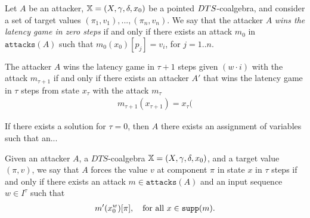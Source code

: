\begin{definition}
Let $A$ be an  attacker, ${\mathbb{X}}=(X,\gamma,\delta,x_0)$ be a pointed $DTS$-coalgebra, and consider a set of target values $(\pi_1,v_1),...,(\pi_n,v_n)$. We say that the attacker $A$ \emph{wins the latency game in zero steps} if and only if there exists an attack $m_0$ in $\texttt{attacks}(A)$ such that $m_0(x_0)[p_j]=v_i$, for $j=1..n$.

The attacker $A$ wins the latency game in $\tau+1$ steps given $(w\cdot i)$ with the attack $m_{\tau+1}$ if and only if there exists an attacker $A'$ that wins the latency game in $\tau$ steps from state $x_\tau$ with the attack $m_{\tau}$
\begin{align}
m_{\tau+1}(x_{\tau +1})=x_\tau(
\end{align}
\end{definition}

If there exists a solution for $\tau=0$, then $A$ there exists an assignment of variables such that an...

\begin{definition}
Given an attacker $A$, a $DTS$-coalgebra ${\mathbb{X}}=(X,\gamma,\delta,x_0)$, and a target value $(\pi,v)$, we say that $A$ forces the value $v$ at component $\pi$ in state $x$ in $\tau$ steps if and only if there exists an attack $m\in \texttt{attacks}(A)$ and an input sequence $w\in I^\tau$ such that
\begin{align}
m' (x_0^w)[\pi], \quad \text{for all $x\in {\texttt{supp}}(m)$}.
\end{align}

\end{definition}







